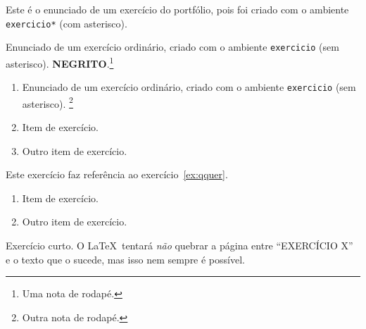 \documentclass[a4paper]{article}
\begin{document}
\maketitle

\begin{exercicio*}
  Este é o enunciado de um exercício do portfólio, pois foi criado com o ambiente \texttt{exercicio*} (com asterisco).
\end{exercicio*}

\begin{exercicio}
  \label{ex:qquer}
  Enunciado de um exercício ordinário, criado com o ambiente \texttt{exercicio} (sem asterisco).
  \textbf{\MakeUppercase{Negrito}}.\footnote{Uma nota de rodapé.}
\end{exercicio}

\begin{exercicio}
  \begin{enumerate}
  \item Enunciado de um exercício ordinário, criado com o ambiente \texttt{exercicio} (sem asterisco).
  \footnote{Outra nota de rodapé.}
  \item Item de exercício.
  \item Outro item de exercício.
  \end{enumerate}
\end{exercicio}

\begin{exercicio}
  Este exercício faz referência ao exercício~\ref{ex:qquer}.
\end{exercicio}

\begin{exercicio}
  \begin{enumerate}
  \item Item de exercício.
  \item Outro item de exercício.
  \end{enumerate}
\end{exercicio}

\begin{exercicio}
  \lipsum[1-20]
\end{exercicio}

\begin{exercicio}
  Exercício curto.
  O \LaTeX\ tentará \emph{não} quebrar a página entre ``EXERCÍCIO X'' e o texto que o sucede, mas isso nem sempre é possível.
\end{exercicio}
\end{document}
